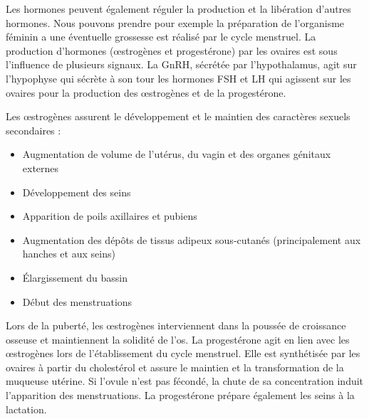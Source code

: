 			Les hormones peuvent également réguler la production et la libération d'autres hormones.
			Nous pouvons prendre pour exemple la préparation de l'organisme féminin a une éventuelle grossesse est réalisé par le cycle menstruel.
			La production d'hormones ({\oe}strogènes et progestérone) par les ovaires est sous l'influence de plusieurs signaux.
			La GnRH, sécrétée par l'hypothalamus, agit sur l'hypophyse qui sécrète à son tour les hormones FSH et LH qui agissent sur les ovaires pour la production des {\oe}strogènes et de la progestérone.

			Les {\oe}strogènes assurent le développement et le maintien des caractères sexuels secondaires :
			\begin{itemize}
					\item   Augmentation de volume de l'utérus, du vagin et des organes génitaux externes
					\item   Développement des seins
					\item   Apparition de poils axillaires et pubiens
					\item   Augmentation des dépôts de tissus adipeux sous-cutanés (principalement aux hanches et aux seins)
					\item   Élargissement du bassin
					\item   Début des menstruations
			\end{itemize}
			\vspace{1.5ex}

			Lors de la puberté, les {\oe}strogènes interviennent dans la poussée de croissance osseuse et maintiennent la solidité de l'os.
			La progestérone agit en lien avec les {\oe}strogènes lors de l'établissement du cycle menstruel.
			Elle est synthétisée par les ovaires à partir du cholestérol et assure le maintien et la transformation de la muqueuse utérine.
			Si l'ovule n'est pas fécondé, la chute de sa concentration induit l'apparition des menstruations.
			La progestérone prépare également les seins à la lactation.



